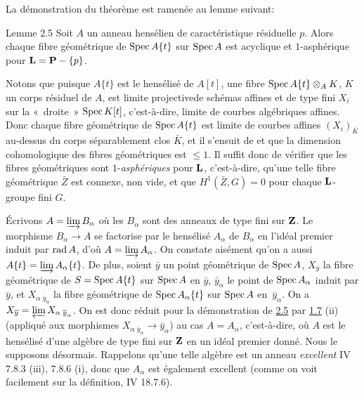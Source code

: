 \documentclass[10pt]{../fichiers-configuration-latex/smfart}
\begin{document}
La démonstration du théorème est ramenée au lemme suivant:

\begin{enonce*}{Lemme 2.5}
Soit $A$ un anneau hensélien de caractéristique résiduelle $p$. Alors
chaque fibre géométrique de $\Spec A\{t\}$ sur $\Spec A$ est acyclique
et $1$-asphérique pour $\LL=\PP-\{p\}$.
\end{enonce*}

Notons que puisque $A\{t\}$ est le hensélisé de $A[t]$, une fibre
$\Spec A\{t\}\otimes_A K$, $K$ un corps résiduel de $A$, est limite
projective\pageoriginale de schémas affines et de type fini $X_i$ sur
la « droite »  $\Spec K[t]$, c'est-à-dire, limite de courbes
algébriques affines. Donc chaque fibre géométrique de $\Spec A\{t\}$
est limite de courbes affines $(X_i)_{\bar{K}}$ au-dessus du corps
séparablement clos $\bar{K}$, et il s'ensuit de  et 
que la dimension cohomologique des fibres géométriques est $\leq 1$. Il
suffit donc de vérifier que les fibres géométriques sont
$1$-\emph{asphériques} pour $\LL$, c'est-à-dire, qu'une telle
fibre géométrique $\bar{Z}$ est connexe, non vide, et que
$H^{1}(\bar{Z},G)=0$ pour chaque $\LL$-groupe fini $G$.

Écrivons $A=\varinjlim B_{\alpha}$ où les $B_{\alpha}$ sont des
anneaux de type fini sur $\ZZ$. Le morphisme
$B_{\alpha}\rightarrow A$ se factorise par le hensélisé $A_{\alpha}$
de $B_{\alpha}$ en l'idéal premier induit par $\rad A$, d'où
$A=\varinjlim A_{\alpha}$. On constate aisément qu'on a aussi
$A\{t\}=\varinjlim A_{\alpha}\{t\}$. De plus, soient $\bar{y}$ un
point géométrique de $\Spec A$, $X_{\bar{y}}$ la fibre géométrique de
$S=\Spec A\{t\}$ sur $\Spec A$ en $\bar{y}$, $\bar{y}_{\alpha}$ le
point de $\Spec A_{\alpha}$ induit par $\bar{y}$, et
$X_{\alpha}\,_{\bar{y}_{\alpha}}$ %
la fibre géométrique de $\Spec A_{\alpha}\{t\}$ sur $\Spec A$ en~$\bar{y}_{\alpha}$. On a
$X_{\bar{y}}=\varprojlim {X_{\alpha}}\,_{\bar{y}_{\alpha}}$. On est donc
réduit pour la démonstration de \hyperref[XV.lem2.5]{2.5} par \hyperref[XV.def1.7]{1.7} (ii) (appliqué aux
morphismes $X_{\alpha}\,_{\bar{y}_{\alpha}}\rightarrow \bar{y}_{\alpha}$)
au cas $A=A_{\alpha}$, c'est-à-dire, où $A$ est le hensélisé d'une
algèbre de type fini sur $\ZZ$ en un idéal premier donné. Nous
le supposons désormais. Rappelons qu'une telle algèbre est un anneau
\emph{excellent} \sisi{(}{}\EGA IV 7.8.3 (iii), 7.8.6 (i)\sisi{)}{}, donc que $A_{\alpha}$
est également excellent (comme on voit facilement sur la définition,
\cf \EGA IV 18.7.6).
\end{document}

